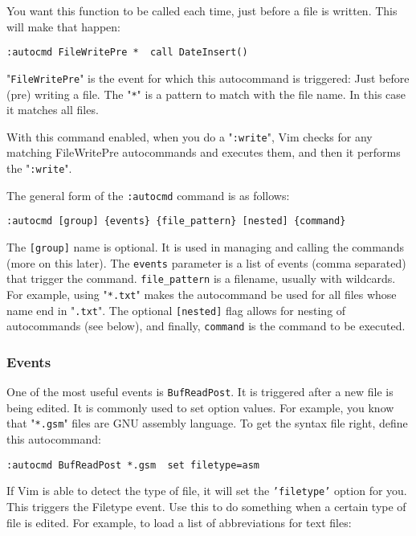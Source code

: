 {{You want this function to be called each time, just before a file is written.
This will make that happen:

\begin{Verbatim}[samepage=true]
 :autocmd FileWritePre *  call DateInsert()
\end{Verbatim}

"\texttt{FileWritePre}" is the event for which this autocommand is triggered: Just before (pre) writing a file.
The "\texttt{*}" is a pattern to match with the file name.
In this case it matches all files.

With this command enabled, when you do a "\texttt{:write}", Vim checks for any matching FileWritePre autocommands and executes them, and then it performs the "\texttt{:write}".

The general form of the \texttt{:autocmd} command is as follows:

\begin{Verbatim}[samepage=true]
 :autocmd [group] {events} {file_pattern} [nested] {command}
\end{Verbatim}

The \texttt{[group]} name is optional.
It is used in managing and calling the commands (more on this later).
The \texttt{{events}} parameter is a list of events (comma separated) that trigger the command.
\texttt{{file\_pattern}} is a filename, usually with wildcards.
For example, using "\texttt{*.txt}" makes the autocommand be used for all files whose name end in "\texttt{.txt}".
The optional \texttt{[nested]} flag allows for nesting of autocommands (see below), and finally, \texttt{{command}} is the command to be executed.

\subsubsection{Events}
One of the most useful events is \texttt{BufReadPost}.
It is triggered after a new file is being edited.
It is commonly used to set option values.
For example, you know that "\texttt{*.gsm}" files are GNU assembly language.
To get the syntax file right, define this autocommand:

\begin{Verbatim}[samepage=true]
 :autocmd BufReadPost *.gsm  set filetype=asm
\end{Verbatim}

If Vim is able to detect the type of file, it will set the \texttt{'filetype'} option for you.
This triggers the Filetype event.
Use this to do something when a certain type of file is edited.
For example, to load a list of abbreviations for text files:

}}

